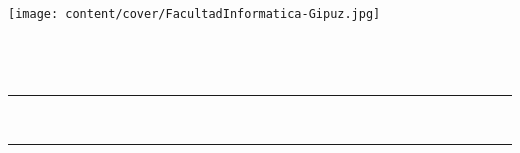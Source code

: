 \thispagestyle{empty}

\newcommand{\HRule}{\rule{\linewidth}{0.5mm}}

\thispagestyle{empty}
\begin{center}

    \texttt{[image: content/cover/FacultadInformatica-Gipuz.jpg]} \\[2cm]


    {\LARGE {\gapizenburua}}\\[0.5cm]
    {\Large \ikasketak}\\[0.25cm]
    {\espezialitatea}\\[2cm]


    \HRule \\[0.3cm]
    {\LARGE
    \textbf{\izenburua}
    }
    \HRule \\[0.5cm]

    \Large \textsl{\egilea}\\


    \vfill

    \textbf{\zuzendariaktestua}\\
    \zuzendariak\\[2cm]

    \data

\end{center}
